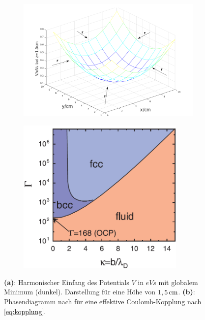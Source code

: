 \documentclass[numbers=noenddot,a4paper,notitlepage,twoside,BCOR15mm]{scrartcl}
\newcommand{\fett}[1]{\textbf{#1}}
\begin{document}
			\begin{figure}
				\centering
				\begin{subfigure}[t]{0.48\textwidth}
					\centering
					\includegraphics[width=1.1\textwidth,height=0.3\textheight]{figs/einfangpotnu.png}
					\caption{}
					\label{img:potential}
				\end{subfigure}
				\begin{subfigure}[t]{0.48\textwidth}
					\centering
					\includegraphics[width=0.9\textwidth,height=0.3\textheight]{figs/gammaphasetransmelzer.png}
					\caption{}
					\label{img:gamma}
				\end{subfigure}
				\caption{\fett{(a)}: Harmonischer Einfang des Potentials $V$ in $\unit{eVs}$ mit globalem Minimum (dunkel). Darstellung für eine Höhe  von $\unit[1,5]{cm}$. \fett{(b)}: Phasendiagramm nach \cite{Melzer12} für eine effektive Coulomb-Kopplung nach \autoref{eq:kopplung}.}
			\end{figure}
\end{document}
